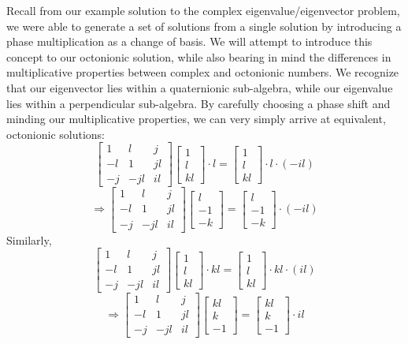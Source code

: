 \documentclass{article}
\theoremstyle{plain}
\begin{document}
Recall from our example solution to the complex eigenvalue/eigenvector problem, we were able to generate a set of solutions from a single solution by introducing a phase multiplication as a change of basis. We will attempt to introduce this concept to our octonionic solution, while also bearing in mind the differences in multiplicative properties between complex and octonionic numbers. We recognize that our eigenvector lies within a quaternionic sub-algebra, while our eigenvalue lies within a perpendicular sub-algebra. By carefully choosing a phase shift and minding our multiplicative properties, we can very simply arrive at equivalent, octonionic solutions:
$$
\begin{bmatrix}
1 & l & j\\
-l & 1 & jl\\
-j & -jl & il
\end{bmatrix}
\begin{bmatrix}
1\\
l\\
kl
\end{bmatrix} \cdot l=\begin{bmatrix}
1\\
l\\
kl
\end{bmatrix} \cdot l \cdot (-il)
$$
$$
\Rightarrow
\begin{bmatrix}
1 & l & j\\
-l & 1 & jl\\
-j & -jl & il
\end{bmatrix}
\begin{bmatrix}
l\\
-1\\
-k
\end{bmatrix}=\begin{bmatrix}
l\\
-1\\
-k
\end{bmatrix} \cdot (-il)
$$
Similarly,
$$
\begin{bmatrix}
1 & l & j\\
-l & 1 & jl\\
-j & -jl & il
\end{bmatrix}
\begin{bmatrix}
1\\
l\\
kl
\end{bmatrix} \cdot kl=\begin{bmatrix}
1\\
l\\
kl
\end{bmatrix} \cdot kl \cdot (il)
$$
$$
\Rightarrow
\begin{bmatrix}
1 & l & j\\
-l & 1 & jl\\
-j & -jl & il
\end{bmatrix}
\begin{bmatrix}
kl\\
k\\
-1
\end{bmatrix}=\begin{bmatrix}
kl\\
k\\
-1
\end{bmatrix} \cdot il
$$
\end{document}
